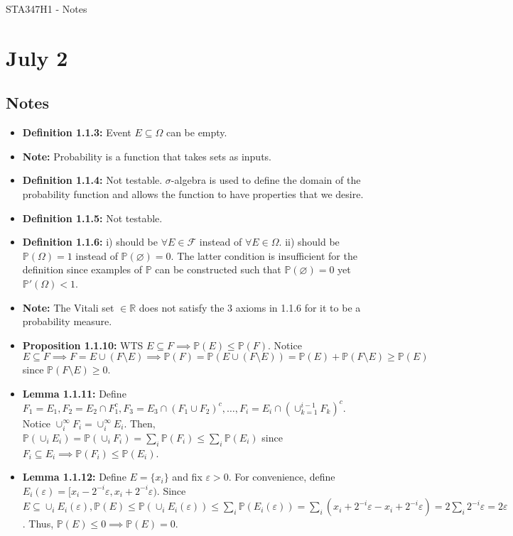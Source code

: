 \documentclass[12pt]{article}
\newcommand{\p}{\mathbb{P}}
\begin{document}
\begin{center}
{\Large STA347H1 - Notes}
\end{center}

\section*{July 2}

\subsection*{Notes}
\begin{itemize}
    \item \textbf{Definition 1.1.3:} Event $E \subseteq \Omega$ can be empty.
    \item \textbf{Note:} Probability is a function that takes sets as inputs.
    \item \textbf{Definition 1.1.4:} Not testable. $\sigma$-algebra is used to define the domain of the probability function and allows the function to have properties that we desire.
    \item \textbf{Definition 1.1.5:} Not testable.
    \item \textbf{Definition 1.1.6:} i) should be $\forall E \in \mathcal{F}$ instead of $\forall E \in \Omega$. ii) should be $\p(\Omega) = 1$ instead of $\p(\varnothing) = 0$. The latter condition is insufficient for the definition since examples of $\p$ can be constructed such that $\p(\varnothing) = 0$ yet $\p'(\Omega) < 1$.
    \item \textbf{Note:} The Vitali set $\in \mathbb{R}$ does not satisfy the 3 axioms in 1.1.6 for it to be a probability measure.
    \item \textbf{Proposition 1.1.10:} WTS $E \subseteq F \implies \p(E) \leq \p(F)$. Notice $E \subseteq F \implies F = E \cup (F \setminus E) \implies \p(F) = \p(E \cup (F \setminus E)) = \p(E) + \p(F \setminus E) \geq \p(E)$ since $\p(F \setminus E) \geq 0$.
    \item \textbf{Lemma 1.1.11:} Define $F_1 = E_1, F_2 = E_2 \cap F_1^c, F_3 = E_3 \cap (F_1 \cup F_2)^c, \ldots, F_i = E_i \cap (\cup_{k=1}^{i-1} F_k)^c$. Notice $\cup_i^\infty F_i = \cup_i^\infty E_i$. Then, $\p(\cup_i E_i) = \p(\cup_i F_i) = \sum_i \p(F_i) \leq \sum_i \p(E_i)$ since $F_i \subseteq E_i \implies \p(F_i) \leq \p(E_i)$.
    \item \textbf{Lemma 1.1.12:} Define $E = \{x_i\}$ and fix $\varepsilon > 0$. For convenience, define $E_i(\varepsilon) = [x_i - 2^{-i}\varepsilon, x_i + 2^{-i}\varepsilon)$. Since $E \subseteq \cup_i E_i(\varepsilon), \p(E) \leq \p(\cup_i E_i(\varepsilon)) \leq \sum_i \p(E_i(\varepsilon)) = \sum_i (x_i + 2^{-i}\varepsilon - x_i + 2^{-i}\varepsilon) = 2\sum_i 2^{-i}\varepsilon = 2\varepsilon$. Thus, $\p(E) \leq 0 \implies \p(E) = 0$.

\end{itemize}
\end{document}
